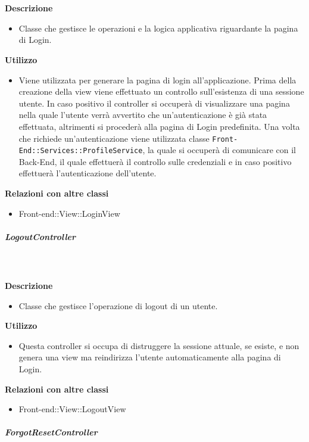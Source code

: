 				\textbf{\\ \\ Descrizione} 
					\begin{itemize}
						\item[] Classe che gestisce le operazioni e la logica applicativa riguardante la pagina di Login.
					\end{itemize}      
				\textbf{Utilizzo}  
					\begin{itemize}
						\item[] Viene utilizzata per generare la pagina di login all'applicazione. Prima della creazione della view viene effettuato un controllo sull'esistenza di una sessione utente. In caso positivo il controller si occuperà di visualizzare una pagina nella quale l'utente verrà avvertito che un'autenticazione è già stata effettuata, altrimenti si procederà alla pagina di Login predefinita. Una volta che richiede un'autenticazione viene utilizzata classe \texttt{Front-End::Services::ProfileService}, la quale si occuperà di comunicare con il Back-End, il quale effettuerà il controllo sulle credenziali e in caso positivo effettuerà l'autenticazione dell'utente.
					\end{itemize}
					\textbf{Relazioni con altre classi}
					\begin{itemize}
							\item{Front-end::View::LoginView}
					\end{itemize}
			\subparagraph{LogoutController}
				
				\textbf{\\ \\ Descrizione} 
					\begin{itemize}
						\item[] Classe che gestisce l'operazione di logout di un utente.
					\end{itemize}      
				\textbf{Utilizzo}  
					\begin{itemize}
						\item[] Questa controller si occupa di distruggere la sessione attuale, se esiste, e non genera una view ma reindirizza l'utente automaticamente alla pagina di Login.
					\end{itemize}
					\textbf{Relazioni con altre classi}
					\begin{itemize}
							\item{Front-end::View::LogoutView}
					\end{itemize}
			\subparagraph{ForgotResetController}
				
